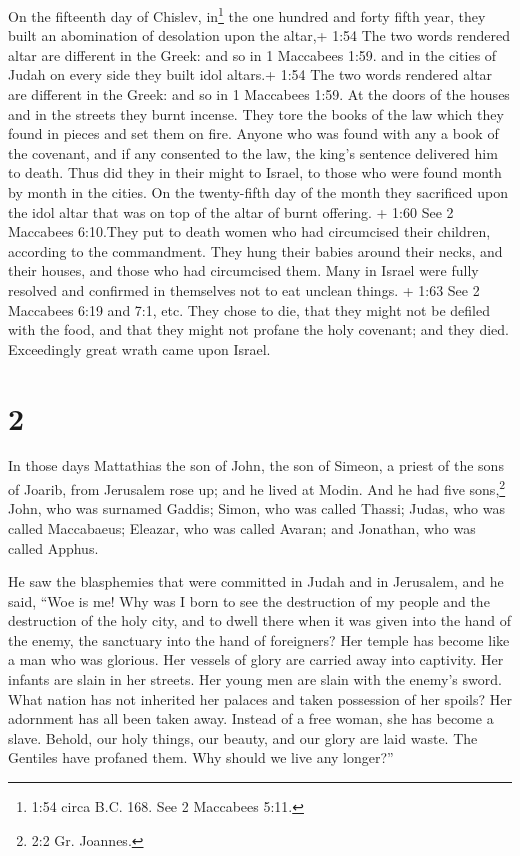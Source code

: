  On the fifteenth day of Chislev, in\footnote{1:54 circa
  B.C. 168. See 2 Maccabees 5:11.} the one hundred and forty fifth year,
they built an abomination of desolation upon the altar,+ 1:54 The two
words rendered altar are different in the Greek: and so in 1 Maccabees
1:59. and in the cities of Judah on every side they built idol altars.+
1:54 The two words rendered altar are different in the Greek: and so in
1 Maccabees 1:59.  At the doors of the houses and in the
streets they burnt incense.  They tore the books of the law
which they found in pieces and set them on fire.  Anyone
who was found with any a book of the covenant, and if any consented to
the law, the king's sentence delivered him to death.  Thus
did they in their might to Israel, to those who were found month by
month in the cities.  On the twenty-fifth day of the month
they sacrificed upon the idol altar that was on top of the altar of
burnt offering.  + 1:60 See 2 Maccabees 6:10.They put to
death women who had circumcised their children, according to the
commandment.  They hung their babies around their necks,
and their houses, and those who had circumcised them.  Many
in Israel were fully resolved and confirmed in themselves not to eat
unclean things.  + 1:63 See 2 Maccabees 6:19 and 7:1, etc.
They chose to die, that they might not be defiled with the food, and
that they might not profane the holy covenant; and they died.
 Exceedingly great wrath came upon Israel.

\hypertarget{section-1}{%
\section{2}\label{section-1}}

 In those days Mattathias the son of John, the son of
Simeon, a priest of the sons of Joarib, from Jerusalem rose up; and he
lived at Modin.  And he had five sons,\footnote{2:2 Gr.
  Joannes.} John, who was surnamed Gaddis;  Simon, who was
called Thassi;  Judas, who was called Maccabaeus;
 Eleazar, who was called Avaran; and Jonathan, who was
called Apphus.

 He saw the blasphemies that were committed in Judah and in
Jerusalem,  and he said, ``Woe is me! Why was I born to see
the destruction of my people and the destruction of the holy city, and
to dwell there when it was given into the hand of the enemy, the
sanctuary into the hand of foreigners?  Her temple has
become like a man who was glorious.  Her vessels of glory
are carried away into captivity. Her infants are slain in her streets.
Her young men are slain with the enemy's sword.  What
nation has not inherited her palaces and taken possession of her spoils?
 Her adornment has all been taken away. Instead of a free
woman, she has become a slave.  Behold, our holy things,
our beauty, and our glory are laid waste. The Gentiles have profaned
them.  Why should we live any longer?''

